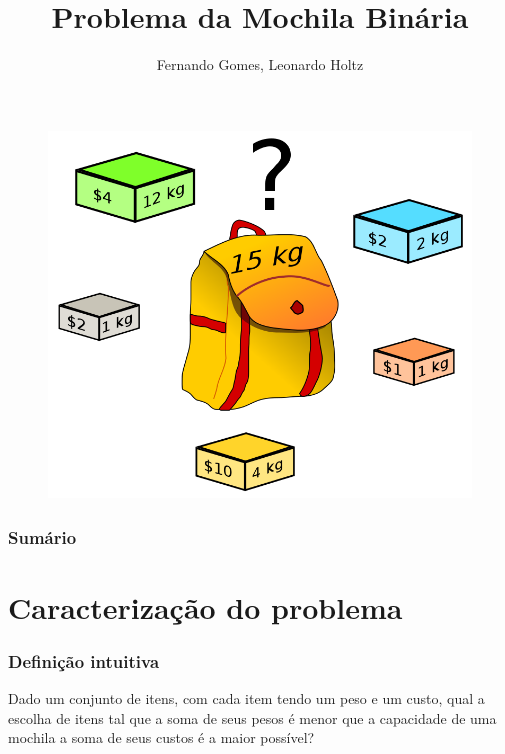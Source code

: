 \documentclass{beamer}
\title{Problema da Mochila Binária}
\author{Fernando Gomes, Leonardo Holtz}
\institute{Universidade Federal do Rio Grande do Sul}
\date{}
\begin{document}
\begin{frame}

\titlepage

\begin{figure}
    \centering
    \includegraphics[scale=0.1]{Knapsack.png}
\end{figure}

\end{frame}

\begin{frame}
\frametitle{Sumário}
\tableofcontents
\end{frame}

\section{Caracterização do problema}

\begin{frame}
\frametitle{Definição intuitiva}

    Dado um conjunto de itens, com cada item tendo um peso
    e um custo, qual a escolha de itens tal que a soma de seus pesos é menor
    que a capacidade de uma mochila a soma de seus custos é a maior possível?

\end{frame}
\end{document}
